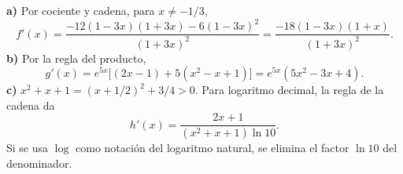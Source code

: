 \textbf{a)} Por cociente y cadena, para $x\ne-1/3$,
\[
f'(x)=\frac{-12(1-3x)(1+3x)-6(1-3x)^2}{(1+3x)^2}
=\boxed{\frac{-18(1-3x)(1+x)}{(1+3x)^2}}.
\]
\textbf{b)} Por la regla del producto,
\[
g'(x)=e^{5x}\bigl[(2x-1)+5(x^2-x+1)\bigr]
=\boxed{e^{5x}(5x^2-3x+4)}.
\]
\textbf{c)} $x^2+x+1=(x+1/2)^2+3/4>0$. Para logaritmo
decimal, la regla de la cadena da
\[
h'(x)=\boxed{\frac{2x+1}{(x^2+x+1)\ln10}}.
\]
Si se usa $\log$ como notación del logaritmo natural,
se elimina el factor $\ln10$ del denominador.
